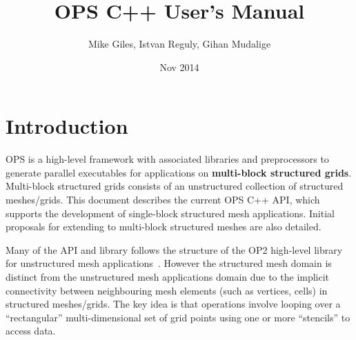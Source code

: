 \documentclass[11pt]{article}
\date{Nov 2014}
\begin{document}
\title{OPS C++ User's Manual}
\author{Mike Giles, Istvan Reguly, Gihan Mudalige}
\maketitle

\newpage


\tableofcontents


\newpage
\section{Introduction}


OPS is a high-level framework with associated libraries and preprocessors to generate parallel executables for
applications on \textbf{multi-block structured grids}. Multi-block structured grids consists of an unstructured
collection of structured meshes/grids. This document describes the current OPS C++ API, which supports the development
of single-block structured mesh applications. Initial proposals for extending to multi-block structured meshes are also
detailed. 

Many of the API and library follows the structure of the OP2 high-level library for unstructured mesh
applications~\cite{op2}. However the structured mesh domain is distinct from the unstructured mesh applications domain
due to the implicit connectivity between neighbouring mesh elements (such as vertices, cells) in structured
meshes/grids. The key idea is that operations involve looping over a ``rectangular'' multi-dimensional set of grid
points using one or more ``stencils'' to access data.\\
\end{document}
